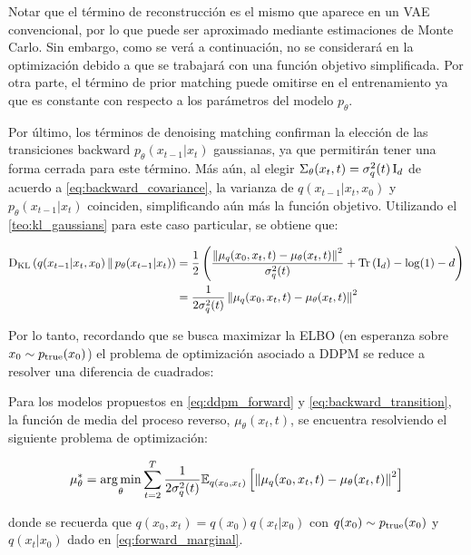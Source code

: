Notar que el término de reconstrucción es el mismo que aparece en un VAE convencional, por lo que puede ser aproximado mediante estimaciones de Monte Carlo. Sin embargo, como se verá a continuación, no se considerará en la optimización debido a que se trabajará con una función objetivo simplificada. Por otra parte, el término de prior matching puede omitirse en el entrenamiento ya que es constante con respecto a los parámetros del modelo $p_\theta$.

Por último, los términos de denoising matching confirman la elección de las transiciones backward $p_\theta(x_{t-1}|x_t)$ gaussianas, ya que permitirán tener una forma cerrada para este término. Más aún, al elegir $\Sigma_\theta(x_t,t)=\sigma_q^2(t)\operatorname{I}_{d}$ de acuerdo a \eqref{eq:backward_covariance}, la varianza de $q(x_{t-1}|x_t,x_0)$ y $p_\theta(x_{t-1}|x_t)$ coinciden, simplificando aún más la función objetivo. Utilizando el \autoref{teo:kl_gaussians} para este caso particular, se obtiene que:

\begin{align*}
    \operatorname{D_{KL}}\left(q(x_{t-1}|x_t,x_0)\,\|\,p_\theta(x_{t-1}|x_t)\right) & = \frac{1}{2}\left(\frac{\left\lVert \mu_q(x_0,x_t, t)-\mu_\theta(x_t,t) \right\rVert^2}{\sigma_q^2(t)}+\operatorname{Tr}\left(\operatorname{I}_{d}\right)-\log(1)-d\right) \\
                                                   & = \frac{1}{2\sigma_q^2(t)} \left\lVert \mu_q(x_0,x_t, t)-\mu_\theta(x_t,t) \right\rVert^2
\end{align*}

Por lo tanto, recordando que se busca maximizar la ELBO (en esperanza sobre $x_0\sim p_{\operatorname{true}}(x_0)$) el problema de optimización asociado a DDPM se reduce a resolver una diferencia de cuadrados:

\begin{prop}
    \label{prop:mu_prediction}

    Para los modelos propuestos en \eqref{eq:ddpm_forward} y \eqref{eq:backward_transition}, la función de media del proceso reverso, $\mu_\theta(x_t,t)$, se encuentra resolviendo el siguiente problema de optimización:

    \begin{equation*}
        \mu_\theta^* = \operatorname*{arg\,min}_{\theta} \sum_{t=2}^T \frac{1}{2\sigma_q^2(t)} \mathbb{E}_{q(x_0,x_t)}\left[\left\lVert \mu_q(x_0,x_t, t)-\mu_\theta(x_t,t) \right\rVert^2\right]
    \end{equation*}

    donde se recuerda que $q(x_0,x_t)=q(x_0)q(x_t|x_0)$ con $q(x_0)\sim p_{\operatorname{true}}(x_0)$ y $q(x_t|x_0)$ dado en \eqref{eq:forward_marginal}.
\end{prop}

